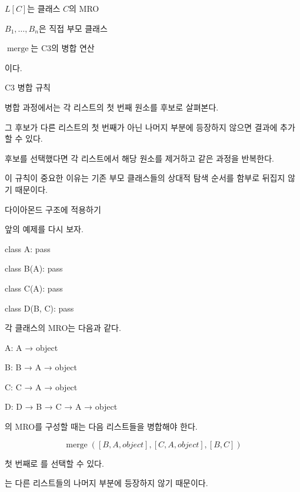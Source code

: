 \(L[C]\)는 클래스 \(C\)의 MRO

\(B_1,\ldots,B_n\)은 직접 부모 클래스

\(\operatorname{merge}\)는 C3의 병합 연산

이다.

\begin{dhknote}
\begin{dhksmry}[centered]
C3 병합 규칙
\end{dhksmry}
\end{dhknote}

병합 과정에서는 각 리스트의 첫 번째 원소를 후보로 살펴본다.

그 후보가 다른 리스트의 첫 번째가 아닌 나머지 부분에 등장하지 않으면 결과에 추가할 수 있다.

후보를 선택했다면 각 리스트에서 해당 원소를 제거하고 같은 과정을 반복한다.

이 규칙이 중요한 이유는 기존 부모 클래스들의 상대적 탐색 순서를 함부로 뒤집지 않기 때문이다.

\begin{dhknote}
\begin{dhksmry}[centered]
다이아몬드 구조에 적용하기
\end{dhksmry}
\end{dhknote}

앞의 예제를 다시 보자.

\begin{dhkcode}
class A:
    pass

class B(A):
    pass

class C(A):
    pass

class D(B, C):
    pass
\end{dhkcode}

각 클래스의 MRO는 다음과 같다.

\begin{dhksmry}
    A: A → object

    B: B → A → object

    C: C → A → object

    D: D → B → C → A → object
\end{dhksmry}

의 MRO를 구성할 때는 다음 리스트들을 병합해야 한다.

\[
\operatorname{merge}
\left(
[B,A,object],
[C,A,object],
[B,C]
\right)
\]

첫 번째로 를 선택할 수 있다.

는 다른 리스트들의 나머지 부분에 등장하지 않기 때문이다.

